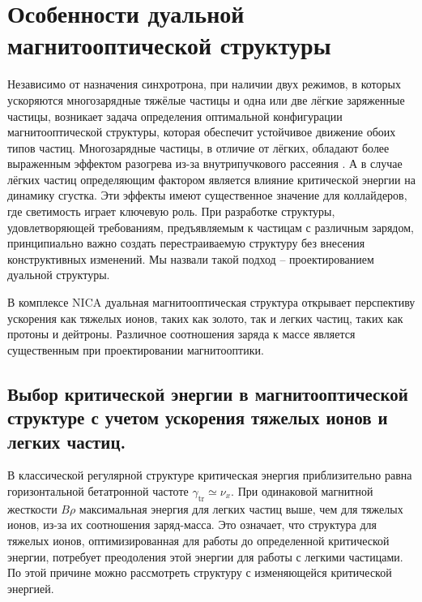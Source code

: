 
	\chapter{Особенности дуальной магнитооптической структуры}\label{ch:dual}

\par Независимо от назначения синхротрона, при наличии двух режимов, в которых ускоряются многозарядные тяжёлые частицы и одна или две лёгкие заряженные частицы, возникает задача определения оптимальной конфигурации магнитооптической структуры, которая обеспечит устойчивое движение обоих типов частиц. Многозарядные частицы, в отличие от лёгких, обладают более выраженным эффектом разогрева из-за внутрипучкового рассеяния \cite{trubnikov:cool}. А в случае лёгких частиц определяющим фактором является влияние критической энергии на динамику сгустка. Эти эффекты имеют существенное значение для коллайдеров, где светимость играет ключевую роль. При разработке структуры, удовлетворяющей требованиям, предъявляемым к частицам с различным зарядом, принципиально важно создать перестраиваемую структуру без внесения конструктивных изменений. Мы назвали такой подход -- проектированием дуальной структуры.

\par В комплексе NICA дуальная магнитооптическая структура открывает перспективу ускорения как тяжелых ионов, таких как золото, так и легких частиц, таких как протоны и дейтроны. Различное соотношения заряда к массе является существенным при проектировании магнитооптики.

	\section{Выбор критической энергии в магнитооптической структуре с учетом ускорения тяжелых ионов и легких частиц.}\label{sec:ch:ions_light/transition}

\par В классической регулярной структуре критическая энергия приблизительно равна горизонтальной бетатронной частоте $\gamma_{\text{tr}}\simeq\nu_{x}$. При одинаковой магнитной жесткости $B\rho$ максимальная энергия для легких частиц выше, чем для тяжелых ионов, из-за их соотношения заряд-масса. Это означает, что структура для тяжелых ионов, оптимизированная для работы до определенной критической энергии, потребует преодоления этой энергии для работы с легкими частицами. По этой причине можно рассмотреть структуру с изменяющейся критической энергией.

